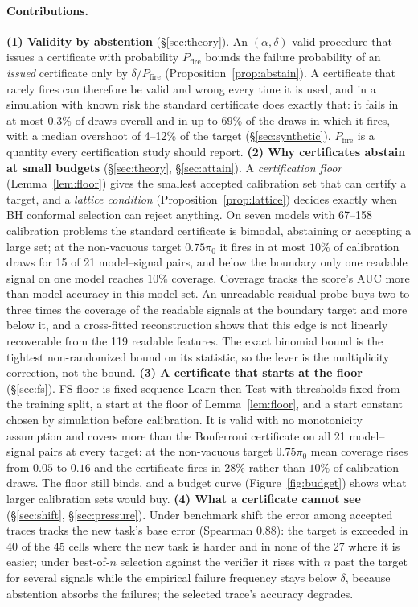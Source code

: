 \documentclass[twoside]{article}
\theoremstyle{remark}
\newcommand{\pizero}{\pi_0}
\newcommand{\pfire}{P_{\mathrm{fire}}}
\begin{document}
\paragraph{Contributions.}
\textbf{(1) Validity by abstention} (\S\ref{sec:theory}). An $(\alpha,\delta)$-valid procedure that issues a certificate with probability $\pfire$ bounds the failure probability of an \emph{issued} certificate only by $\delta/\pfire$ (Proposition~\ref{prop:abstain}). A certificate that rarely fires can therefore be valid and wrong every time it is used, and in a simulation with known risk the standard certificate does exactly that: it fails in at most $0.3\%$ of draws overall and in up to $69\%$ of the draws in which it fires, with a median overshoot of 4--12\% of the target (\S\ref{sec:synthetic}). $\pfire$ is a quantity every certification study should report.
\textbf{(2) Why certificates abstain at small budgets} (\S\ref{sec:theory}, \S\ref{sec:attain}). A \emph{certification floor} (Lemma~\ref{lem:floor}) gives the smallest accepted calibration set that can certify a target, and a \emph{lattice condition} (Proposition~\ref{prop:lattice}) decides exactly when BH conformal selection can reject anything. On seven models with 67--158 calibration problems the standard certificate is bimodal, abstaining or accepting a large set; at the non-vacuous target $0.75\pizero$ it fires in at most $10\%$ of calibration draws for 15 of 21 model--signal pairs, and below the boundary only one readable signal on one model reaches $10\%$ coverage. Coverage tracks the score's AUC more than model accuracy in this model set. An unreadable residual probe buys two to three times the coverage of the readable signals at the boundary target and more below it, and a cross-fitted reconstruction shows that this edge is not linearly recoverable from the 119 readable features. The exact binomial bound is the tightest non-randomized bound on its statistic, so the lever is the multiplicity correction, not the bound.
\textbf{(3) A certificate that starts at the floor} (\S\ref{sec:fs}). FS-floor is fixed-sequence Learn-then-Test \citep{angelopoulos2021ltt} with thresholds fixed from the training split, a start at the floor of Lemma~\ref{lem:floor}, and a start constant chosen by simulation before calibration. It is valid with no monotonicity assumption and covers more than the Bonferroni certificate on all 21 model--signal pairs at every target: at the non-vacuous target $0.75\pizero$ mean coverage rises from $0.05$ to $0.16$ and the certificate fires in $28\%$ rather than $10\%$ of calibration draws. The floor still binds, and a budget curve (Figure~\ref{fig:budget}) shows what larger calibration sets would buy.
\textbf{(4) What a certificate cannot see} (\S\ref{sec:shift}, \S\ref{sec:pressure}). Under benchmark shift the error among accepted traces tracks the new task's base error (Spearman $0.88$): the target is exceeded in 40 of the 45 cells where the new task is harder and in none of the 27 where it is easier; under best-of-$n$ selection against the verifier it rises with $n$ past the target for several signals while the empirical failure frequency stays below $\delta$, because abstention absorbs the failures; the selected trace's accuracy degrades.
\end{document}
